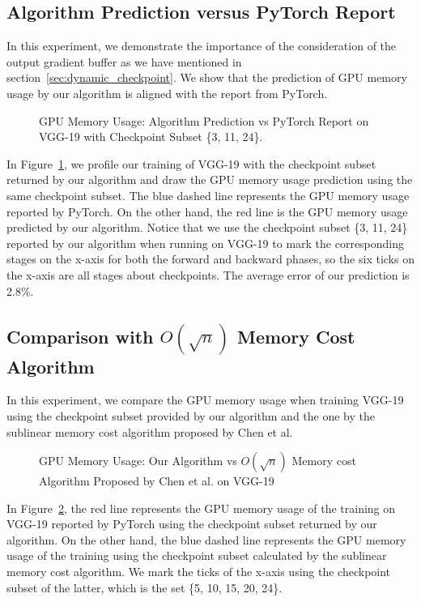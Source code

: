 \subsection{Algorithm Prediction versus PyTorch Report} \label{sec:prediction}

In this experiment, we demonstrate the importance of the consideration of the output gradient buffer as we have mentioned in section~\ref{sec:dynamic_checkpoint}. We show that the prediction of GPU memory usage by our algorithm is aligned with the report from PyTorch.

\begin{figure}[h!t]
    \centering
    
    \caption{GPU Memory Usage: Algorithm Prediction vs PyTorch Report on VGG-19 with Checkpoint Subset \{3, 11, 24\}.} 
    \label{fig:algo_pred_vs_pytorch_report}
\end{figure}

In Figure~\ref{fig:algo_pred_vs_pytorch_report}, we profile our training of VGG-19 with the checkpoint subset returned by our algorithm and draw the GPU memory usage prediction using the same checkpoint subset.
The blue dashed line represents the GPU memory usage reported by PyTorch.
On the other hand, the red line is the GPU memory usage predicted by our algorithm. Notice that we use the checkpoint subset \{3, 11, 24\} reported by our algorithm when running on VGG-19 to mark the corresponding stages on the x-axis for both the forward and backward phases, so the six ticks on the x-axis are all stages about checkpoints.
The average error of our prediction is 2.8\%.


\subsection{Comparison with $O(\sqrt{n})$ Memory Cost Algorithm}

In this experiment, we compare the GPU memory usage when training VGG-19 using the checkpoint subset provided by our algorithm and the one by the sublinear memory cost algorithm proposed by Chen et al.

\begin{figure}[h!tb]
    \centering
    
    \caption{GPU Memory Usage: Our Algorithm vs $O(\sqrt{n})$ Memory cost Algorithm Proposed by Chen et al. on VGG-19} 
    \label{fig:our_algo_vs_sublinear}
\end{figure}

In Figure~\ref{fig:our_algo_vs_sublinear}, the red line represents the GPU memory usage of the training on VGG-19 reported by PyTorch using the checkpoint subset returned by our algorithm. On the other hand, the blue dashed line represents the GPU memory usage of the training using the checkpoint subset calculated by the sublinear memory cost algorithm. We mark the ticks of the x-axis using the checkpoint subset of the latter, which is the set \{5, 10, 15, 20, 24\}.

